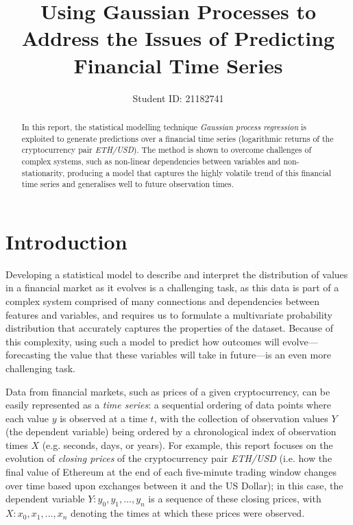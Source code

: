 \documentclass[a4paper, 11pt]{article}
\title{Using Gaussian Processes to Address the Issues of Predicting Financial Time Series}
\author{Student ID: 21182741}
\date{}
\begin{document}
    \maketitle

    \begin{abstract}
        In this report, the statistical modelling technique \emph{Gaussian process regression} is exploited to generate predictions over a financial time series (logarithmic returns of the cryptocurrency pair \emph{ETH/USD}). The method is shown to overcome challenges of complex systems, such as non-linear dependencies between variables and non-stationarity, producing a model that captures the highly volatile trend of this financial time series and generalises well to future observation times.   
    \end{abstract}

    \section{Introduction}

    Developing a statistical model to describe and interpret the distribution of values in a financial market as it evolves is a challenging task, as this data is part of a complex system comprised of many connections and dependencies between features and variables, and requires us to formulate a multivariate probability distribution that accurately captures the properties of the dataset. Because of this complexity, using such a model to predict how outcomes will evolve---forecasting the value that these variables will take in future---is an even more challenging task. 

    Data from financial markets, such as prices of a given cryptocurrency, can be easily represented as a \emph{time series}: a sequential ordering of data points where each value $y$ is observed at a time $t$, with the collection of observation values $Y$ (the dependent variable) being ordered by a chronological index of observation times $X$ (e.g. seconds, days, or years). For example, this report focuses on the evolution of \emph{closing prices} of the cryptocurrency pair \emph{ETH/USD} (i.e. how the final value of Ethereum at the end of each five-minute trading window changes over time based upon exchanges between it and the US Dollar); in this case, the dependent variable $Y \colon y_0, y_1, \ldots, y_n$ is a sequence of these closing prices, with $X \colon x_0, x_1, \ldots, x_n$ denoting the times at which these prices were observed.
\end{document}
